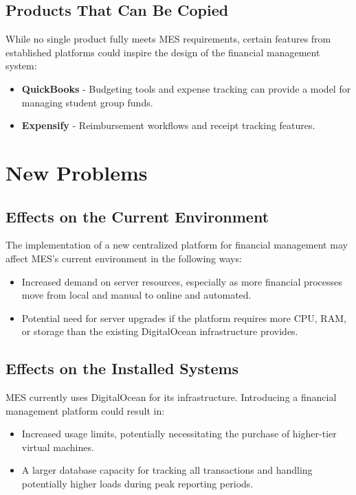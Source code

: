 \documentclass[12pt]{article}
\begin{document}
\subsection{Products That Can Be Copied}
While no single product fully meets MES requirements, certain features from established platforms could inspire the design of the financial management system:
\begin{itemize}
    \item \textbf{QuickBooks} - Budgeting tools and expense tracking can provide a model for managing student group funds.
    \item \textbf{Expensify} - Reimbursement workflows and receipt tracking features.
\end{itemize}

\section{New Problems}
\subsection{Effects on the Current Environment}
The implementation of a new centralized platform for financial management may affect MES's current environment in the following ways:
\begin{itemize}
    \item Increased demand on server resources, especially as more financial processes move from local and manual to online and automated.
    \item Potential need for server upgrades if the platform requires more CPU, RAM, or storage than the existing DigitalOcean infrastructure provides.
\end{itemize}

\subsection{Effects on the Installed Systems}
MES currently uses DigitalOcean for its infrastructure. Introducing a financial management platform could result in:
\begin{itemize}
    \item Increased usage limits, potentially necessitating the purchase of higher-tier virtual machines.
    \item A larger database capacity for tracking all transactions and handling potentially higher loads during peak reporting periods.
\end{itemize}
\end{document}
